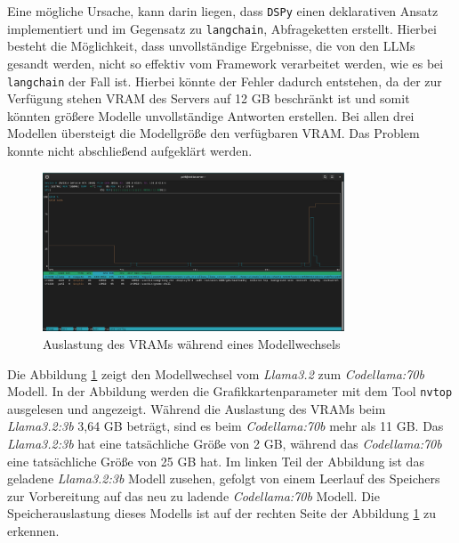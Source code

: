 Eine mögliche Ursache, kann darin liegen, dass \texttt{DSPy} einen deklarativen Ansatz implementiert und im Gegensatz zu \texttt{langchain}, Abfrageketten erstellt. Hierbei besteht die Möglichkeit, dass unvollständige Ergebnisse, die von den LLMs gesandt werden, nicht so effektiv vom Framework verarbeitet werden, wie es bei \texttt{langchain} der Fall ist. Hierbei könnte der Fehler dadurch entstehen, da der zur Verfügung stehen VRAM des Servers auf 12 GB beschränkt ist und somit könnten größere Modelle unvollständige Antworten erstellen. Bei allen drei Modellen übersteigt die Modellgröße den verfügbaren VRAM.  Das Problem konnte nicht abschließend aufgeklärt werden.\vspace{0.2cm}

\begin{figure}[!ht]
	\includegraphics[width=0.8\textwidth]{content/chapter_lessons_learned/images/nvtop_model_change.eps}
	\centering
	\caption{Auslastung des VRAMs während eines Modellwechsels}
	\label{img:bash_nvtop_model_change}
\end{figure}

Die Abbildung \ref{img:bash_nvtop_model_change} zeigt den Modellwechsel vom \textit{Llama3.2} zum \textit{Codellama:70b} Modell. In der Abbildung werden die Grafikkartenparameter mit dem Tool \texttt{nvtop} ausgelesen und angezeigt. Während die Auslastung des VRAMs beim \textit{Llama3.2:3b} 3,64 GB beträgt, sind es beim \textit{Codellama:70b} mehr als 11 GB. Das \textit{Llama3.2:3b} hat eine tatsächliche Größe von 2 GB, während das \textit{Codellama:70b} eine tatsächliche Größe von 25 GB hat. Im linken Teil der Abbildung ist das geladene \textit{Llama3.2:3b} Modell zusehen, gefolgt von einem Leerlauf des Speichers zur Vorbereitung auf das neu zu ladende \textit{Codellama:70b} Modell. Die Speicherauslastung dieses Modells ist auf der rechten Seite der Abbildung \ref{img:bash_nvtop_model_change} zu erkennen.
